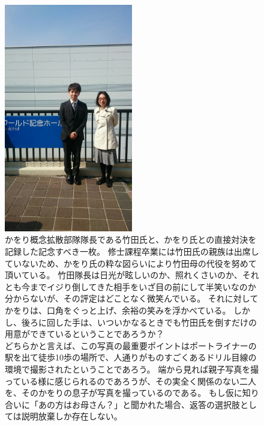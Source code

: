 \begin{figure}[H]
  \centering
  \includegraphics[width=0.5\textwidth]{./section/Kawori/figures/KaworiPo.jpg}
  \caption{かをり概念拡散部隊隊長である竹田氏と、かをり氏との直接対決を記録した記念すべき一枚。
  修士課程卒業には竹田氏の親族は出席していないため、かをり氏の粋な図らいにより竹田母の代役を努めて頂いている。
竹田隊長は日光が眩しいのか、照れくさいのか、それとも今までイジり倒してきた相手をいざ目の前にして半笑いなのか分からないが、その評定はどことなく微笑んでいる。
それに対してかをりは、口角をぐっと上げ、余裕の笑みを浮かべている。
しかし、後ろに回した手は、いついかなるときでも竹田氏を倒すだけの用意ができているということであろうか？\\
どちらかと言えば、この写真の最重要ポイントはポートライナーの駅を出て徒歩10歩の場所で、人通りがものすごくあるドリル目線の環境で撮影されたということであろう。
端から見れば親子写真を撮っている様に感じられるのであろうが、その実全く関係のない二人を、そのかをりの息子が写真を撮っているのである。
もし仮に知り合いに「あの方はお母さん？」と聞かれた場合、返答の選択肢としては説明放棄しか存在しない。
  }
\label{fig:KaworiPo}
\end{figure}

